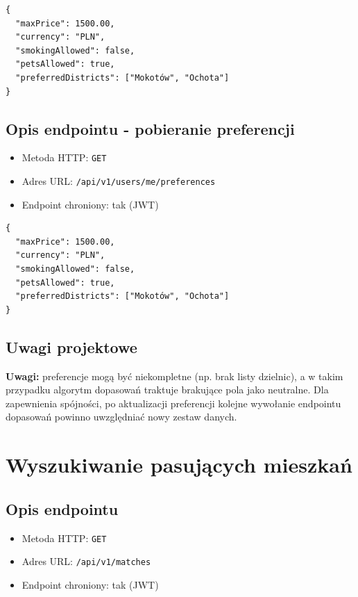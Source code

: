 \documentclass[11pt, a4paper]{article}
\begin{document}
\begin{lstlisting}[style=json,caption={Ciało żądania — preferencje Lokatora}]
{
  "maxPrice": 1500.00,
  "currency": "PLN",
  "smokingAllowed": false,
  "petsAllowed": true,
  "preferredDistricts": ["Mokotów", "Ochota"]
}
\end{lstlisting}

\subsection{Opis endpointu - pobieranie preferencji}

\begin{itemize}
    \item Metoda HTTP: \texttt{GET}
    \item Adres URL: \texttt{/api/v1/users/me/preferences}
    \item Endpoint chroniony: tak (JWT)
\end{itemize}

\begin{lstlisting}[style=json,caption={Ciało odpowiedzi — sukces}]
{
  "maxPrice": 1500.00,
  "currency": "PLN",
  "smokingAllowed": false,
  "petsAllowed": true,
  "preferredDistricts": ["Mokotów", "Ochota"]
}
\end{lstlisting}

\subsection{Uwagi projektowe}

\noindent\textbf{Uwagi:} preferencje mogą być niekompletne (np. brak listy dzielnic), a w takim przypadku algorytm dopasowań traktuje brakujące pola jako neutralne.
Dla zapewnienia spójności, po aktualizacji preferencji kolejne wywołanie endpointu dopasowań powinno uwzględniać nowy zestaw danych.

\section{Wyszukiwanie pasujących mieszkań}

\subsection{Opis endpointu}

\begin{itemize}
    \item Metoda HTTP: \texttt{GET}
    \item Adres URL: \texttt{/api/v1/matches}
    \item Endpoint chroniony: tak (JWT)
\end{itemize}
\end{document}
